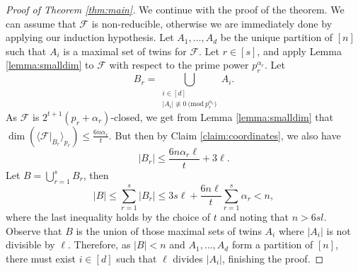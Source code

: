 \begin{proof}[Proof of Theorem \ref{thm:main}]
		We continue with the proof of the theorem.
		We can assume that $\mathcal{F}$ is non-reducible, otherwise we are immediately done 
		by applying our induction hypothesis. Let $A_{1},\dots,A_{d}$ be the unique partition of $[n]$ such that $A_{i}$ is a maximal set of twins for $\mathcal{F}$. Let $r\in [s]$, and apply Lemma \ref{lemma:smalldim} to $\mathcal{F}$ with respect to the prime power $p_r^{\alpha_r}$. Let $$B_r=\bigcup_{\substack{i\in [d]\\|A_i|\not\equiv 0\ \mathrm{(mod }\ p_r^{\alpha_r})}}A_{i}.$$  As $\mathcal{F}$ is $2^{t+1}(p_r+\alpha_r)$-closed, we get from Lemma \ref{lemma:smalldim} that $\dim(\langle \mathcal{F}|_{B_r}\rangle_{p_r})\leq \frac{6n\alpha_r}{t}$. But then by Claim \ref{claim:coordinates}, we also have 
		$$|B_r|\leq \frac{6n\alpha_r\ell}{t}+3\ell.$$
		Let $B=\bigcup_{r=1}^{s}B_{r}$, then 
		$$|B|\leq\sum_{r=1}^{s}|B_{r}|\leq 3s\ell+\frac{6n\ell}{t}\sum_{r=1}^{s}\alpha_r <n,$$
		where the last inequality holds by the choice of $t$ and noting that $n > 6sl$. Observe that $B$ is the union of those maximal sets of twins $A_{i}$ where $|A_i|$ is not divisible by $\ell$. Therefore, as $|B|< n$ and $A_{1},\dots,A_{d}$ form a partition of $[n]$, there must exist $i\in [d]$ such that $\ell$ divides $|A_{i}|$, finishing the proof.
	\end{proof}

